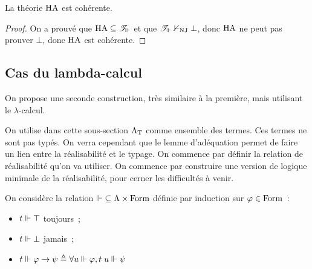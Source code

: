 \begin{theorem}
  La théorie $\operatorname{HA}$ est cohérente.
\end{theorem}

\begin{proof}
  On a prouvé que $\operatorname{HA} \subseteq \mathscr T_{\Vdash}$ et que
  $\mathscr T_{\Vdash}\nvdash_{\operatorname{NJ}} \bot$, donc $\operatorname{HA}$ ne peut pas prouver
  $\bot$, donc $\operatorname{HA}$ est cohérente.
\end{proof}

\subsection{Cas du lambda-calcul}

On propose une seconde construction, très similaire à la première, mais
utilisant le $\lambda$-calcul.

On utilise dans cette sous-section $\Lambda_{\mathrm{T}}$ comme ensemble des termes. Ces
termes ne sont pas  typés. On verra cependant que le lemme
d'adéquation permet de faire un lien entre la réalisabilité et le typage. On
commence par définir la relation de réalisabilité qu'on va utiliser. On commence
par construire une version de logique minimale de la réalisabilité, pour cerner
les difficultés à venir.

\begin{definition}
  On considère la relation $\mathord{\Vdash}\subseteq \Lambda\times \operatorname{Form}$
  définie par induction sur $\varphi \in \operatorname{Form}$~:
  \begin{itemize}
  \item $t \Vdash \top$ toujours~;
  \item $t \Vdash \bot$ jamais~;
  \item $t\Vdash \varphi \to \psi \triangleq \forall u \Vdash \varphi, t\;u \Vdash
    \psi$
  \end{itemize}
\end{definition}

